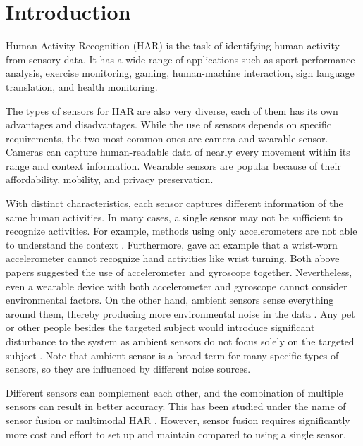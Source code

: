 \documentclass[conference]{IEEEtran}
\begin{document}
\maketitle

\section{Introduction}
\label{sec:introduction}

Human Activity Recognition (HAR) is the task of identifying human activity from sensory data. It has a wide range of applications such as sport performance analysis, exercise monitoring, gaming, human-machine interaction, sign language translation, and health monitoring.

The types of sensors for HAR are also very diverse, each of them has its own advantages and disadvantages. While the use of sensors depends on specific requirements, the two most common ones are camera and wearable sensor. Cameras can capture human-readable data of nearly every movement within its range and context information. Wearable sensors are popular because of their affordability, mobility, and privacy preservation.

With distinct characteristics, each sensor captures different information of the same human activities. In many cases, a single sensor may not be sufficient to recognize activities. For example, methods using only accelerometers are not able to understand the context \cite{Kwolek2016}. Furthermore, \cite{Zhang2020} gave an example that a wrist-worn accelerometer cannot recognize hand activities like wrist turning. Both above papers suggested the use of accelerometer and gyroscope together. Nevertheless, even a wearable device with both accelerometer and gyroscope cannot consider environmental factors. On the other hand, ambient sensors sense everything around them, thereby producing more environmental noise in the data \cite{Hakim2017,Denkovski2022}. Any pet or other people besides the targeted subject would introduce significant disturbance to the system as ambient sensors do not focus solely on the targeted subject \cite{Wang2020}. Note that ambient sensor is a broad term for many specific types of sensors, so they are influenced by different noise sources.

Different sensors can complement each other, and the combination of multiple sensors can result in better accuracy. This has been studied under the name of sensor fusion or multimodal HAR \cite{Aguileta2019,Yadav2021}. However, sensor fusion requires significantly more cost and effort to set up and maintain compared to using a single sensor.
\end{document}
